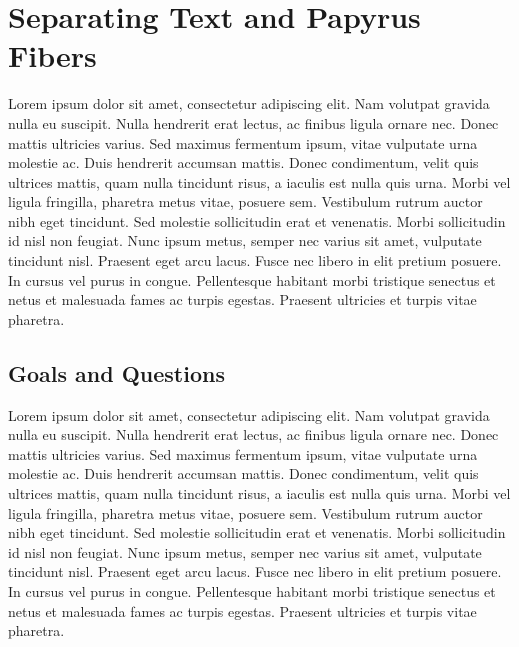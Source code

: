 \chapter{Separating Text and Papyrus Fibers}
Lorem ipsum dolor sit amet, consectetur adipiscing elit. Nam volutpat gravida nulla eu suscipit. Nulla hendrerit erat lectus, ac finibus ligula ornare nec. Donec mattis ultricies varius. Sed maximus fermentum ipsum, vitae vulputate urna molestie ac. Duis hendrerit accumsan mattis. Donec condimentum, velit quis ultrices mattis, quam nulla tincidunt risus, a iaculis est nulla quis urna. Morbi vel ligula fringilla, pharetra metus vitae, posuere sem. Vestibulum rutrum auctor nibh eget tincidunt. Sed molestie sollicitudin erat et venenatis. Morbi sollicitudin id nisl non feugiat. Nunc ipsum metus, semper nec varius sit amet, vulputate tincidunt nisl. Praesent eget arcu lacus. Fusce nec libero in elit pretium posuere. In cursus vel purus in congue. Pellentesque habitant morbi tristique senectus et netus et malesuada fames ac turpis egestas. Praesent ultricies et turpis vitae pharetra.

\section{Goals and Questions}
Lorem ipsum dolor sit amet, consectetur adipiscing elit. Nam volutpat gravida nulla eu suscipit. Nulla hendrerit erat lectus, ac finibus ligula ornare nec. Donec mattis ultricies varius. Sed maximus fermentum ipsum, vitae vulputate urna molestie ac. Duis hendrerit accumsan mattis. Donec condimentum, velit quis ultrices mattis, quam nulla tincidunt risus, a iaculis est nulla quis urna. Morbi vel ligula fringilla, pharetra metus vitae, posuere sem. Vestibulum rutrum auctor nibh eget tincidunt. Sed molestie sollicitudin erat et venenatis. Morbi sollicitudin id nisl non feugiat. Nunc ipsum metus, semper nec varius sit amet, vulputate tincidunt nisl. Praesent eget arcu lacus. Fusce nec libero in elit pretium posuere. In cursus vel purus in congue. Pellentesque habitant morbi tristique senectus et netus et malesuada fames ac turpis egestas. Praesent ultricies et turpis vitae pharetra.

